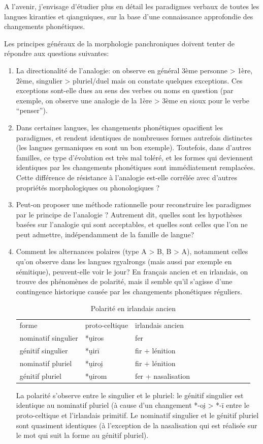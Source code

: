 \documentclass[oldfontcommands,oneside,a4paper,11pt]{memoir}
\begin{document}
A l'avenir, j'envisage d'étudier plus en détail les paradigmes verbaux de toutes les langues kiranties et qianguiques, sur la base d'une connaissance approfondie des changements phonétiques. 
 
Les principes généraux de la morphologie panchroniques doivent tenter de répondre aux questions suivantes: 

\begin{enumerate}
\item La directionalité de l'analogie: on observe en général 3ème personne > 1ère, 2ème, singulier > pluriel/duel mais on constate quelques exceptions. Ces exceptions sont-elle dues au sens des verbes ou noms en question (par exemple, on observe une analogie de la 1ère > 3ème en sioux pour le verbe ``penser''). 

\item Dans certaines langues, les changements phonétiques opacifient les paradigmes, et rendent identiques de nombreuses formes autrefois distinctes (les langues germaniques en sont un bon exemple). Toutefois, dans d'autres familles, ce type d'évolution est très mal toléré, et les formes qui deviennent identiques par les changements phonétiques sont immédiatement remplacées.  Cette différence de résistance à l'analogie est-elle corrélée avec d'autres propriétés morphologiques ou phonologiques ?

\item Peut-on proposer une méthode rationnelle pour reconstruire les paradigmes par le principe de l'analogie ? Autrement dit, quelles sont les hypothèses basées sur l'analogie qui sont acceptables, et quelles sont celles que l'on ne peut admettre, indépendamment  de la famille de langue?

\item Comment les alternances polaires (type A > B, B > A), notamment celles qu'on observe dans les langues rgyalrongs (mais aussi par exemple en sémitique), peuvent-elle voir le jour? En français ancien et en irlandais, on trouve des phénomènes de polarité, mais il semble qu'il s'agisse d'une contingence historique causée par les changements phonétiques réguliers. 
\begin{table}[H]
\caption{Polarité en irlandais ancien} 
\begin{tabular}{lllllllllll}  \toprule  
forme & proto-celtique & irlandais ancien \\
nominatif singulier & *u̯iros & fer \\
génitif singulier & *u̯irī & fir + lénition \\
nominatif pluriel & *u̯iroi̯ & fir + lénition \\
génitif pluriel & *u̯irom & fer + nasalisation \\
\bottomrule
\end{tabular}
\end{table}
La polarité s'observe entre le singulier et le pluriel: le génitif singulier est identique au nominatif pluriel (à cause d'un changement *-oi̯ > *-ī entre le proto-celtique et l'irlandais primitif. Le nominatif singulier et le génitif pluriel sont quasiment identiques (à l'exception de la nasalisation qui est réalisée sur le mot qui suit la forme au génitif pluriel). 


\end{enumerate}
\end{document}
